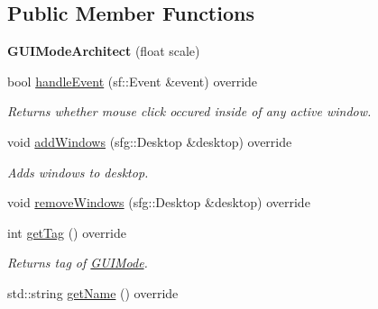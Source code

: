 \subsection*{Public Member Functions}
\begin{DoxyCompactItemize}
\item 
\hypertarget{classGUIModeArchitect_a25d9eef53cf72c398980f2f136b9db08}{{\bfseries G\-U\-I\-Mode\-Architect} (float scale)}\label{classGUIModeArchitect_a25d9eef53cf72c398980f2f136b9db08}

\item 
\hypertarget{classGUIModeArchitect_a1910f3c1df018197bcfadba64ff75e8a}{bool \hyperlink{classGUIModeArchitect_a1910f3c1df018197bcfadba64ff75e8a}{handle\-Event} (sf\-::\-Event \&event) override}\label{classGUIModeArchitect_a1910f3c1df018197bcfadba64ff75e8a}

\begin{DoxyCompactList}\small\item\em Returns whether mouse click occured inside of any active window. \end{DoxyCompactList}\item 
\hypertarget{classGUIModeArchitect_ae2955e9bcc44c9e98b6847ded59776f2}{void \hyperlink{classGUIModeArchitect_ae2955e9bcc44c9e98b6847ded59776f2}{add\-Windows} (sfg\-::\-Desktop \&desktop) override}\label{classGUIModeArchitect_ae2955e9bcc44c9e98b6847ded59776f2}

\begin{DoxyCompactList}\small\item\em Adds windows to desktop. \end{DoxyCompactList}\item 
void \hyperlink{classGUIModeArchitect_aea6eeeba6cf9597beb326d38e63af49d}{remove\-Windows} (sfg\-::\-Desktop \&desktop) override
\item 
\hypertarget{classGUIModeArchitect_a202aafb3e8a66efd900860a780e9b316}{int \hyperlink{classGUIModeArchitect_a202aafb3e8a66efd900860a780e9b316}{get\-Tag} () override}\label{classGUIModeArchitect_a202aafb3e8a66efd900860a780e9b316}

\begin{DoxyCompactList}\small\item\em Returns tag of \hyperlink{classGUIMode}{G\-U\-I\-Mode}. \end{DoxyCompactList}\item 
\hypertarget{classGUIModeArchitect_a9c018f2150bcd1fc4e3cecf43702418a}{std\-::string \hyperlink{classGUIModeArchitect_a9c018f2150bcd1fc4e3cecf43702418a}{get\-Name} () override}\label{classGUIModeArchitect_a9c018f2150bcd1fc4e3cecf43702418a}


\end{DoxyCompactItemize}
